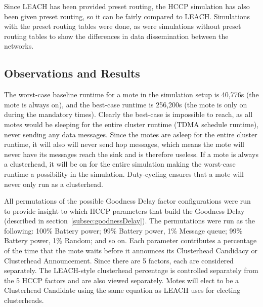 Since LEACH has been provided preset routing, the HCCP simulation has also been 
given preset routing, so it can be fairly compared to LEACH. Simulations with
the preset routing tables were done, as were simulations without preset routing tables 
to show the differences in data dissemination between the networks.




\subsection{Observations and Results}


The worst-case baseline runtime for a mote in the simulation setup is 40,776s (the mote is always on), and the best-case runtime is
256,200s (the mote is only on during the mandatory times). Clearly the best-case is impossible to reach, as all motes would be sleeping 
for the entire cluster runtime (TDMA schedule runtime), never sending any data messages. 
Since the motes are asleep for the entire cluster runtime,  it will also will
never send hop messages, which means the mote will never have its messages reach the sink and is therefore useless. If 
a mote is always a clusterhead, it will be on for the entire simulation making the worst-case runtime a possibility in 
the simulation. Duty-cycling ensures that a mote will never only run as a clusterhead.
%
% 
% 



All permutations of the possible Goodness Delay factor configurations were run to provide insight to which 
HCCP parameters that build the Goodness Delay  (described in section~\ref{subsec:goodnessDelay}). 
The permutations were run as the following: 100\% Battery power; 99\% Battery power, 1\% Message queue; 99\% Battery power,
1\% Random; and so on.
Each parameter contributes a percentage of the time that the mote waits before it 
announces its Clusterhead Candidacy or Clusterhead Announcement. Since there are 5 factors,
each are considered separately. The LEACH-style clusterhead percentage is controlled separately from the 
5 HCCP factors and are also viewed separately. Motes will elect to be a Clusterhead Candidate using the same
equation as LEACH uses for electing clusterheads.

